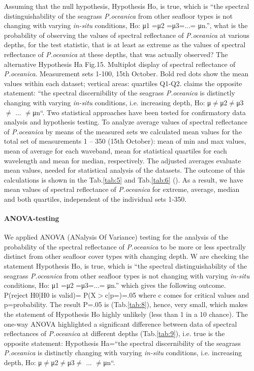 \documentclass[11pt]{article}
\begin{document}
Assuming that the null hypothesis, Hypothesis Ho, is true, which is “the spectral distinguishability of
the seagrass \textit{P.oceanica} from other seafloor types is not changing with varying \textit{in-situ} conditions,
Ho: μ1 =μ2 =μ3=...= μn.”, what is the probability of observing the values of spectral reflectance of
\textit{P.oceanica} at various depths, for the test statistic, that is at least as extreme as the values of spectral
reflectance of \textit{P.oceanica} at these depths, that was actually observed? The alternative Hypothesis Ha
Fig.15. Multiplot display of spectral reflectance of \textit{P.oceanica}. Measurement sets 1-100, 15th
October. Bold red dots show the mean values within each dataset; vertical areas: quartiles Q1-Q2.
claims the opposite statement: “the spectral discernibility of the seagrass \textit{P.oceanica} is distinctly
changing with varying \textit{in-situ} conditions, i.e. increasing depth, Ho: μ$\neq$μ2$\neq$μ3$\neq$ ... $\neq$μn“.
Two statistical approaches have been tested for confirmatory data analysis and hypothesis testing.
To analyze average values of spectral reflectance of \textit{P.oceanica} by means of the measured sets we calculated 
mean values for the total set of measurements 1 – 350 (15th October): mean of min and max values, 
mean of average for each waveband, mean for statistical quartiles for each wavelength and mean for median, respectively. 
The adjusted averages evaluate mean values, needed for statistical analysis of the datasets. 
The outcome of this calculations is shown in the Tab.\ref{tab:5} and Tab.\ref{tab:6} (). 
As a result, we have mean values of spectral reflectance of \textit{P.oceanica} for extreme, average, median and both quartiles,
independent of the individual sets 1-350. 

\paragraph{ANOVA-testing}
We applied \ac{ANOVA} (ANalysis Of Variance) testing for the analysis of the probability of the
spectral reflectance of \textit{P.oceanica} to be more or less spectrally distinct from other seafloor cover
types with changing depth. W are checking the statement Hypothesis Ho, is true, which is “the
spectral distinguishability of the seagrass \textit{P.oceanica} from other seafloor types is not changing with
varying \textit{in-situ} conditions, Ho: μ1 =μ2 =μ3=...= μn.” which gives the following outcome.
P(reject H0|H0 is valid)= P(X$>$c|p=)=.05
where c comes for critical values and p=probability.
The result P=.05 is (Tab.\ref{tab:8}), hence, very small, which makes the statement of Hypothesis Ho highly unlikely
(less than 1 in a 10 chance). The one-way \ac{ANOVA} highlighted a significant difference between data
of spectral reflectances of \textit{P.oceanica} at different depths (Tab.\ref{tab:9}), i.e. true is the opposite statement:
Hypothesis Ha=“the spectral discernibility of the seagrass \textit{P.oceanica} is distinctly changing with
varying \textit{in-situ} conditions, i.e. increasing depth, Ho: μ$\neq$μ2$\neq$μ3$\neq$ ... $\neq$μn“.
\end{document}
